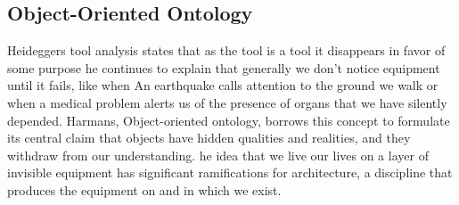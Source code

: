 \subsection{Object-Oriented Ontology}
\label{subsec:ObjectOrientedOntology}

Heideggers tool analysis states that as the tool is a tool it disappears in favor of some purpose he continues to explain that generally we don't notice equipment until it fails, like when An earthquake calls attention to the ground we walk or when a medical problem alerts us of the presence of organs that we have silently depended\cite{Harman2011}.
Harmans, Object-oriented ontology, borrows this concept to formulate its central claim that objects have hidden qualities and realities, and they withdraw from our understanding.\cite{Gage2015}
he idea that we live our lives on a layer of invisible equipment has significant ramifications for architecture, a discipline that produces the equipment on and in which we exist.\cite{Gage2015}
